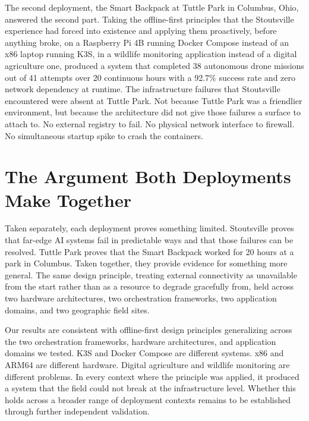 The second deployment, the Smart Backpack at Tuttle Park in Columbus, Ohio, answered the second part. Taking the offline-first principles that the Stoutsville experience had forced into existence and applying them proactively, before anything broke, on a Raspberry Pi 4B running Docker Compose instead of an x86 laptop running K3S, in a wildlife monitoring application instead of a digital agriculture one, produced a system that completed 38 autonomous drone missions out of 41 attempts over 20 continuous hours with a 92.7\% success rate and zero network dependency at runtime. The infrastructure failures that Stoutsville encountered were absent at Tuttle Park. Not because Tuttle Park was a friendlier environment, but because the architecture did not give those failures a surface to attach to. No external registry to fail. No physical network interface to firewall. No simultaneous startup spike to crash the containers.

\section{The Argument Both Deployments Make Together}
\label{sec:concl_rq2}
Taken separately, each deployment proves something limited. Stoutsville proves that far-edge AI systems fail in predictable ways and that those failures can be resolved. Tuttle Park proves that the Smart Backpack worked for 20 hours at a park in Columbus. Taken together, they provide evidence for something more general. The same design principle, treating external connectivity as unavailable from the start rather than as a resource to degrade gracefully from, held across two hardware architectures, two orchestration frameworks, two application domains, and two geographic field sites.

Our results are consistent with offline-first design principles generalizing across the two orchestration frameworks, hardware architectures, and application domains we tested. K3S and Docker Compose are different systems. x86 and ARM64 are different hardware. Digital agriculture and wildlife monitoring are different problems. In every context where the principle was applied, it produced a system that the field could not break at the infrastructure level. Whether this holds across a broader range of deployment contexts remains to be established through further independent validation.

